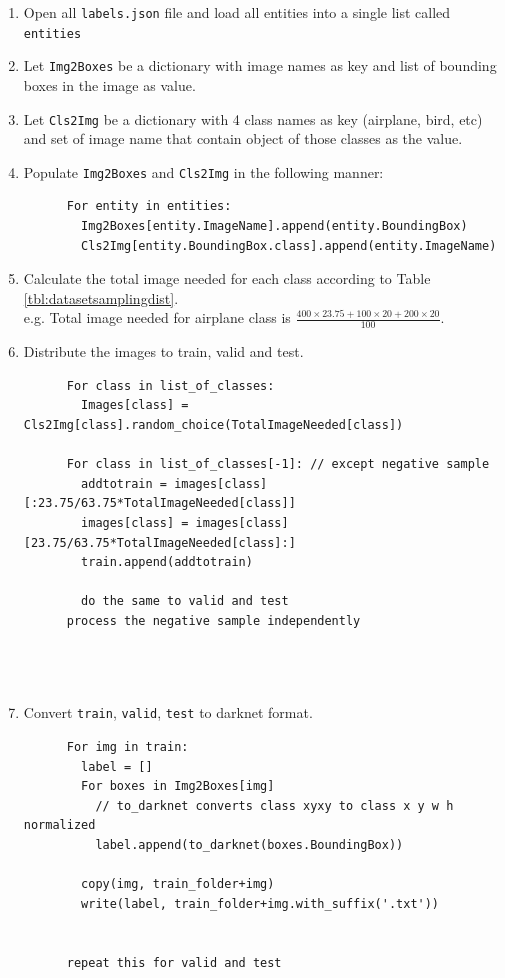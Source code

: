     \begin{enumerate}
      \item Open all \verb|labels.json| file and load all entities into a single list called \verb*|entities|
      \item Let \verb|Img2Boxes| be a dictionary with image names as key and list of bounding boxes in the image as value.
      \item Let \verb|Cls2Img| be a dictionary with 4 class names as key (airplane, bird, etc) and set of image name that contain object of those classes as the value.
      \item Populate \verb|Img2Boxes| and \verb|Cls2Img| in the following manner:
      \begin{lstlisting}
      For entity in entities:
        Img2Boxes[entity.ImageName].append(entity.BoundingBox)
        Cls2Img[entity.BoundingBox.class].append(entity.ImageName)
      \end{lstlisting}
      \item Calculate the total image needed for each class according to Table \ref{tbl:datasetsamplingdist}.\\
            e.g. Total image needed for airplane class is $\frac{400\times 23.75+100\times 20+200\times 20}{100}$.
      \item Distribute the images to train, valid and test.
      \begin{lstlisting}
      For class in list_of_classes:
        Images[class] = Cls2Img[class].random_choice(TotalImageNeeded[class])

      For class in list_of_classes[-1]: // except negative sample
        addtotrain = images[class][:23.75/63.75*TotalImageNeeded[class]]
        images[class] = images[class][23.75/63.75*TotalImageNeeded[class]:]
        train.append(addtotrain)

        do the same to valid and test
      process the negative sample independently
        

      
      \end{lstlisting}
    
      \item Convert \verb|train|, \verb|valid|, \verb|test| to darknet format.
      \begin{lstlisting}
      For img in train:
        label = []
        For boxes in Img2Boxes[img]
          // to_darknet converts class xyxy to class x y w h normalized
          label.append(to_darknet(boxes.BoundingBox))

        copy(img, train_folder+img)
        write(label, train_folder+img.with_suffix('.txt'))


      repeat this for valid and test
      \end{lstlisting}
    \end{enumerate}


